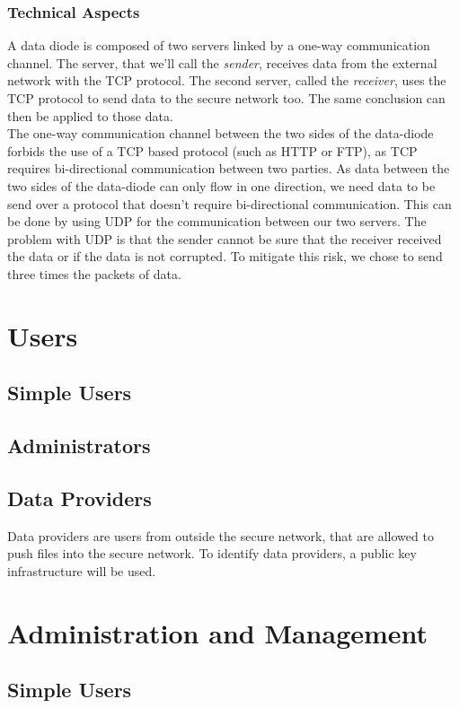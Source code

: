 \documentclass[a4paper,11pt]{article}
\begin{document}
\subsubsection{Technical Aspects}
A data diode is composed of two servers linked by a one-way communication channel. The server, that we'll call the \textit{sender}, receives data from the external network with the TCP protocol. The second server, called the \textit{receiver}, uses the TCP protocol to send data to the secure network too. The same conclusion can then be applied to those data.\\

The one-way communication channel between the two sides of the data-diode forbids the use of a TCP based protocol (such as HTTP or FTP), as TCP requires bi-directional communication between two parties. As data between the two sides of the data-diode can only flow in one direction, we need data to be send over a protocol that doesn't require bi-directional communication. This can be done by using UDP for the communication between our two servers. The problem with UDP is that the sender cannot be sure that the receiver received the data or if the data is not corrupted. To mitigate this risk, we chose to send three times the packets of data.


\section{Users}
\subsection{Simple Users}

\subsection{Administrators}

\subsection{Data Providers}
Data providers are users from outside the secure network, that are allowed to push files into the secure network. To identify data providers, a public key infrastructure will be used.

\section{Administration and Management}
\subsection{Simple Users}
\end{document}
